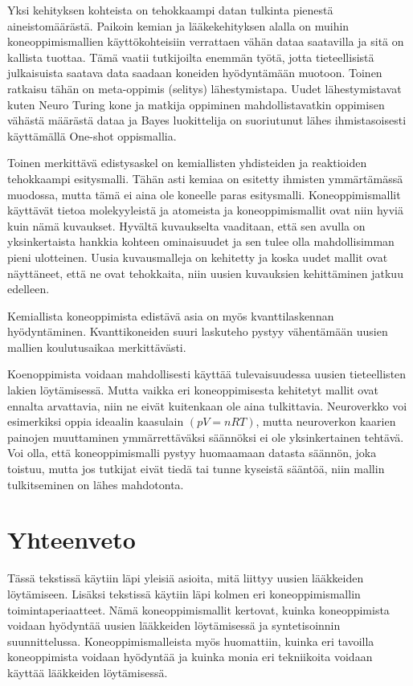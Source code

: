 \documentclass[finnish,twoside,censored,tkt,sw-line]{HYthesisML}
\begin{document}
Yksi kehityksen kohteista on tehokkaampi datan tulkinta pienestä aineistomäärästä.
Paikoin kemian ja lääkekehityksen alalla on muihin koneoppimismallien käyttökohteisiin verrattaen vähän dataa saatavilla ja sitä on kallista tuottaa.
Tämä vaatii tutkijoilta enemmän työtä, jotta tieteellisistä julkaisuista saatava data saadaan koneiden hyödyntämään muotoon.
Toinen ratkaisu tähän on meta-oppimis (selitys) lähestymistapa.
Uudet lähestymistavat kuten Neuro Turing kone ja matkija oppiminen mahdollistavatkin oppimisen vähästä määrästä dataa ja Bayes luokittelija on suoriutunut lähes ihmistasoisesti käyttämällä One-shot oppismallia.

Toinen merkittävä edistysaskel on kemiallisten yhdisteiden ja reaktioiden tehokkaampi esitysmalli.
Tähän asti kemiaa on esitetty ihmisten ymmärtämässä muodossa, mutta tämä ei aina ole koneelle paras esitysmalli.
Koneoppimismallit käyttävät tietoa molekyyleistä ja atomeista ja koneoppimismallit ovat niin hyviä kuin nämä kuvaukset.
Hyvältä kuvaukselta vaaditaan, että sen avulla on yksinkertaista hankkia kohteen ominaisuudet ja sen tulee olla mahdollisimman pieni ulotteinen.
Uusia kuvausmalleja on kehitetty ja koska uudet mallit ovat näyttäneet, että ne ovat tehokkaita, niin uusien kuvauksien kehittäminen jatkuu edelleen.

Kemiallista koneoppimista edistävä asia on myös kvanttilaskennan hyödyntäminen.
Kvanttikoneiden suuri laskuteho pystyy vähentämään uusien mallien koulutusaikaa merkittävästi.

Koenoppimista voidaan mahdollisesti käyttää tulevaisuudessa uusien tieteellisten lakien löytämisessä.
Mutta vaikka eri koneoppimisesta kehitetyt mallit ovat ennalta arvattavia, niin ne eivät kuitenkaan ole aina tulkittavia.
Neuroverkko voi esimerkiksi oppia ideaalin kaasulain \((pV=nRT)\), mutta neuroverkon kaarien painojen muuttaminen ymmärrettäväksi säännöksi ei ole yksinkertainen tehtävä.
Voi olla, että koneoppimismalli pystyy huomaamaan datasta säännön, joka toistuu, mutta jos tutkijat eivät tiedä tai tunne kyseistä sääntöä, niin mallin tulkitseminen on lähes mahdotonta.

\chapter{Yhteenveto}

Tässä tekstissä käytiin läpi yleisiä asioita, mitä liittyy uusien lääkkeiden löytämiseen.
Lisäksi tekstissä käytiin läpi kolmen eri koneoppimismallin toimintaperiaatteet.
Nämä koneoppimismallit kertovat, kuinka koneoppimista voidaan hyödyntää uusien lääkkeiden löytämisessä ja syntetisoinnin suunnittelussa.
Koneoppimismalleista myös huomattiin, kuinka eri tavoilla koneoppimista voidaan hyödyntää ja kuinka monia eri tekniikoita voidaan käyttää lääkkeiden löytämisessä.
\end{document}

